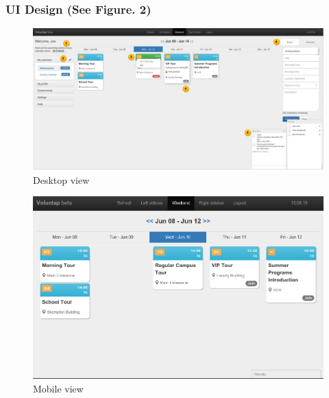\documentclass[10pt,a4paper]{article}
\begin{document}
\subsubsection{UI Design (See Figure. 2)}

\begin{figure}
 \includegraphics[width=\textwidth]{labeled_app.pdf}
 \caption{Desktop view}
\end{figure}

\begin{figure}
\includegraphics[width=\textwidth]{mobileView.png}
\caption{Mobile view}
\end{figure}
\end{document}
